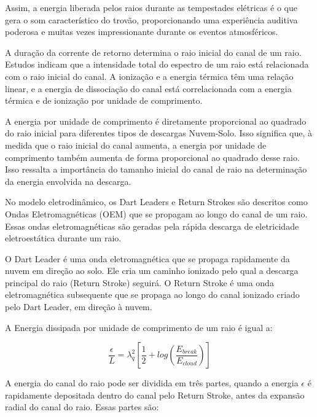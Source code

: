 \documentclass[a4paper, 12pt, onecolumn,singlespacing]{article}
\begin{document}
	Assim, a energia liberada pelos raios durante as tempestades elétricas é o que gera o som característico do trovão, proporcionando uma experiência auditiva poderosa e muitas vezes impressionante durante os eventos atmosféricos.
		
	A duração da corrente de retorno determina o raio inicial do canal de um raio. Estudos indicam que a intensidade total do espectro de um raio está relacionada com o raio inicial do canal. A ionização e a energia térmica têm uma relação linear, e a energia de dissociação do canal está correlacionada com a energia térmica e de ionização por unidade de comprimento.
	
	A energia por unidade de comprimento é diretamente proporcional ao quadrado do raio inicial para diferentes tipos de descargas Nuvem-Solo. Isso significa que, à medida que o raio inicial do canal aumenta, a energia por unidade de comprimento também aumenta de forma proporcional ao quadrado desse raio. Isso ressalta a importância do tamanho inicial do canal de raio na determinação da energia envolvida na descarga.
	
	No modelo eletrodinâmico, os Dart Leaders e Return Strokes são descritos como Ondas Eletromagnéticas (OEM) que se propagam ao longo do canal de um raio. Essas ondas eletromagnéticas são geradas pela rápida descarga de eletricidade eletroestática durante um raio.
	
	O Dart Leader é uma onda eletromagnética que se propaga rapidamente da nuvem em direção ao solo. Ele cria um caminho ionizado pelo qual a descarga principal do raio (Return Stroke) seguirá. O Return Stroke é uma onda eletromagnética subsequente que se propaga ao longo do canal ionizado criado pelo Dart Leader, em direção à nuvem.
	
	
	A Energia dissipada por unidade de comprimento de um raio é igual a:
	
	\begin{equation}
		\frac{\epsilon}{L} = \lambda_q^2\left[\frac{1}{2} + log\left(\frac{E_{break}}{E_{cloud}}\right)\right]
	\end{equation}

	A energia do canal do raio pode ser dividida em três partes, quando a energia $\epsilon$ é rapidamente depositada dentro do canal pelo Return Stroke, antes da expansão radial do canal do raio. Essas partes são:
\end{document}
